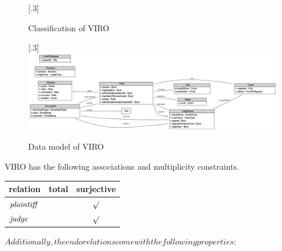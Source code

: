 \documentclass[10pt,a4paper]{report}              %
\theoremstyle{plain}\theorembodyfont{\rmfamily}\newtheorem{definition}{Definition}[section]
\theoremstyle{plain}\theorembodyfont{\rmfamily}\newtheorem{designrule}[definition]{Requirement}
\def\id#1{\mbox{\em #1\/}}
\begin{document}
\begin{figure}[htb]
\begin{center}
\scalebox{.3}[.3]{\includegraphics{CDclassificationVIRO}}
\caption{Classification of VIRO}
\label{fig:CDclassificationVIRO}
\end{center}
\end{figure}
\begin{figure}[htb]
\begin{center}
\scalebox{.3}[.3]{\includegraphics{CDVIRO}}
\caption{Data model of VIRO}
\label{fig:CDVIRO}
\end{center}
\end{figure}
VIRO has the following associations and multiplicity constraints. 

\begin{center}
\begin{tabular}{lcc}
relation & total & surjective\\
\hline
${\id{plaintiff}}$ &  & $\surd$\\
${\id{judge}}~$ &  & $\surd$\\
\end{tabular}
\end{center}

$Additionally, the endorelations come with the following properties: $
\end{document}
